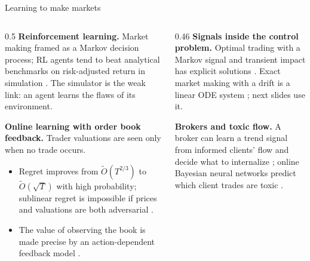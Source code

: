 \begin{frame}{Learning to make markets}
  \footnotesize
  \begin{columns}[T]
    \begin{column}{0.5\textwidth}
      \textbf{Reinforcement learning.} Market making framed as a Markov decision process; RL agents tend to beat analytical benchmarks on risk-adjusted return in simulation \citep{gasperov2021reinforcement}. The simulator is the weak link: an agent learns the flaws of its environment.

      \vspace{0.5em}
      \textbf{Online learning with order book feedback.} Trader valuations are seen only when no trade occurs.
      \begin{itemize}
        \item Regret improves from $\tilde O(T^{2/3})$ to $\tilde O(\sqrt T)$ with high probability; sublinear regret is impossible if prices and valuations are both adversarial \citep{vischi2026optimal}.
        \item The value of observing the book is made precise by an action-dependent feedback model \citep{maran2026online}.
      \end{itemize}
    \end{column}
    \begin{column}{0.46\textwidth}
      \textbf{Signals inside the control problem.} Optimal trading with a Markov signal and transient impact has explicit solutions \citep{lehalle2019incorporating}. Exact market making with a drift is a linear ODE system \citep{gueant2013dealing}; next slides use it.

      \vspace{0.5em}
      \textbf{Brokers and toxic flow.} A broker can learn a trend signal from informed clients' flow and decide what to internalize \citep{cartea2025brokers}; online Bayesian neural networks predict which client trades are toxic \citep{cartea2023detecting}.
    \end{column}
  \end{columns}
\end{frame}

